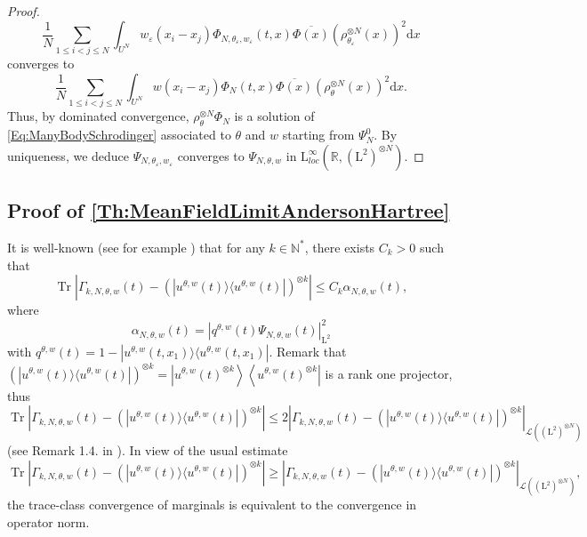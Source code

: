 \documentclass{article}
\def\R{\mathbb R}
\def\N{\mathbb N}
\def\L{\mathrm L}
\def\eps{\varepsilon}
\DeclareMathOperator{\Tr}{Tr}
\def\d{\mathrm{d}}
\theoremstyle{definition}
\numberwithin{equation}{section}
\begin{document}
\begin{proof}
    $$\frac{1}{N}\sum_{1\leqslant i<j\leqslant N}\int_{U^N} w_\eps(x_i-x_j)\Phi_{N,\theta_{\eps},w_\eps}(t,x)\overline{\Phi(x)}\left(\rho_{\theta_\eps}^{\otimes N}(x)\right)^2 \d x$$
    converges to
    $$\frac{1}{N}\sum_{1\leqslant i<j\leqslant N}\int_{U^N} w(x_i-x_j)\Phi_{N}(t,x)\overline{\Phi(x)}\left(\rho_{\theta}^{\otimes N}(x)\right)^2 \d x.$$
    Thus, by dominated convergence, $\rho_\theta^{\otimes N}\Phi_N$ is a solution of \cref{Eq:ManyBodySchrodinger} associated to $\theta$ and $w$ starting from $\Psi_N^0$. By uniqueness, we deduce $\Psi_{N,\theta_\eps,w_\eps}$ converges to $\Psi_{N,\theta,w}$ in $\L^\infty_{loc}(\R,(\L^2)^{\otimes N})$.

\end{proof}

\subsection{Proof of \cref{Th:MeanFieldLimitAndersonHartree}}

It is well-known (see for example \cite{PicklKnowles,RodnianskiQuantumFluctuations}) that for any $k\in\N^*$, there exists $C_k>0$ such that
\begin{equation}\label{Eq:ControlTraceNormAlpha}
    \Tr\left|\Gamma_{k,N,\theta,w}(t)-\left(|u^{\theta,w}(t)\rangle\langle u^{\theta,w}(t)|\right)^{\otimes k}\right|\leqslant C_k\alpha_{N,\theta,w}(t),
\end{equation}
where 
$$\alpha_{N,\theta,w}(t) = \left|q^{\theta,w}(t)\Psi_{N,\theta,w}(t)\right|_{\L^2}^2$$ with $q^{\theta,w}(t) = 1-|u^{\theta,w}(t,x_1)\rangle\langle u^{\theta,w}(t,x_1)|$. Remark that $\left(|u^{\theta,w}(t)\rangle\langle u^{\theta,w}(t)|\right)^{\otimes k}=\left|u^{\theta,w}(t)^{\otimes k}\right\rangle\left\langle u^{\theta,w}(t)^{\otimes k}\right|$ is a rank one projector, thus 
\begin{equation}\label{Eq:ControlTraceNormByOpNorm}
    \Tr\left|\Gamma_{k,N,\theta,w}(t)-\left(|u^{\theta,w}(t)\rangle\langle u^{\theta,w}(t)|\right)^{\otimes k}\right|\leqslant 2\left|\Gamma_{k,N,\theta,w}(t)-\left(|u^{\theta,w}(t)\rangle\langle u^{\theta,w}(t)|\right)^{\otimes k}\right|_{\mathcal{L}\left((\L^2)^{\otimes N}\right)}
\end{equation}
(see Remark 1.4. in \cite{RodnianskiQuantumFluctuations}). In view of the usual estimate
\begin{equation}\label{Eq:ControlOpNormByTraceNorm}
    \Tr\left|\Gamma_{k,N,\theta,w}(t)-\left(|u^{\theta,w}(t)\rangle\langle u^{\theta,w}(t)|\right)^{\otimes k}\right|\geqslant \left|\Gamma_{k,N,\theta,w}(t)-\left(|u^{\theta,w}(t)\rangle\langle u^{\theta,w}(t)|\right)^{\otimes k}\right|_{\mathcal{L}\left((\L^2)^{\otimes N}\right)},
\end{equation}
the trace-class convergence of marginals is equivalent to the convergence in operator norm.\\
\end{document}
